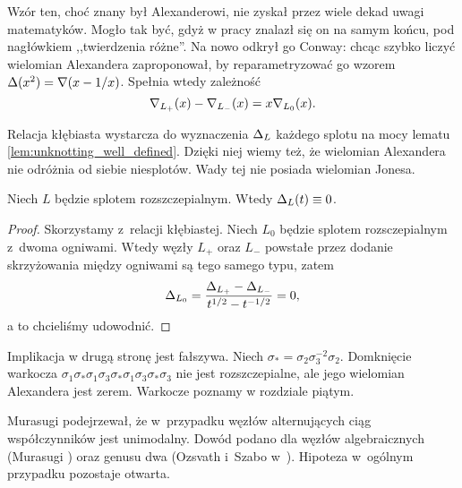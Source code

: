Wzór ten, choć znany był Alexanderowi, nie zyskał przez wiele dekad uwagi matematyków.
Mogło tak być, gdyż w pracy \cite{alexander28} znalazł się on na samym końcu, pod nagłówkiem ,,twierdzenia różne''.
Na nowo odkrył go Conway: chcąc szybko liczyć wielomian Alexandera zaproponował, by reparametryzować go wzorem $\Delta(x^2) = \nabla(x - 1/x)$.
Spełnia wtedy zależność
\begin{equation}
    \nabla_{L_+}(x)- \nabla_{L_-}(x) = x \nabla_{L_0}(x).
\end{equation}

Relacja kłębiasta wystarcza do wyznaczenia $\Delta_L$ każdego splotu na mocy lematu \ref{lem:unknotting_well_defined}.
Dzięki niej wiemy też, że wielomian Alexandera nie odróżnia od siebie niesplotów.
Wady tej nie posiada wielomian Jonesa.

\begin{proposition}
    \label{prp:alexander_unlinks}
    Niech $L$ będzie splotem rozszczepialnym.
    Wtedy $\Delta_L(t) \equiv 0$.
\end{proposition}

\begin{proof}
    Skorzystamy z~relacji kłębiastej.
    Niech $L_0$ będzie splotem rozsczepialnym z~dwoma ogniwami.
    Wtedy węzły $L_+$ oraz $L_-$ powstałe przez dodanie skrzyżowania między ogniwami są tego samego typu, zatem
    \begin{equation}
        \Delta_{L_0} = \frac{\Delta_{L_+} - \Delta_{L_-}}{t^{1/2} - t^{-1/2}} = 0,
    \end{equation}
    a to chcieliśmy udowodnić.
\end{proof}

Implikacja w drugą stronę jest fałszywa.
Niech $\sigma_* = \sigma_{2} \sigma_{3}^{-2} \sigma_{2}$.
Domknięcie warkocza $\sigma_{1} \sigma_* \sigma_{1} \sigma_{3} \sigma_* \sigma_{1} \sigma_{3} \sigma_* \sigma_{3}$ nie jest rozszczepialne, ale jego wielomian Alexandera jest zerem.
Warkocze poznamy w rozdziale piątym.


Murasugi podejrzewał, że w~przypadku węzłów alternujących ciąg współczynników jest unimodalny.
Dowód podano dla węzłów algebraicznych (Murasugi \cite{murasugi85}) oraz genusu dwa (Ozsvath i~Szabo w~\cite{ozsvath03}).
Hipoteza w~ogólnym przypadku pozostaje otwarta.


